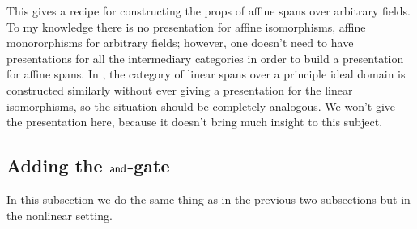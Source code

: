 This gives a recipe for constructing the props of affine spans over arbitrary fields.  To my knowledge there is no presentation for affine isomorphisms, affine monororphisms for arbitrary fields; however, one doesn't need to have presentations for all the intermediary categories in order to build a presentation for affine spans.  In \cite[\S 3.3]{ih}, the category of linear spans over a principle ideal domain is constructed similarly without ever giving a presentation for the linear isomorphisms, so the situation should be completely analogous.  We won't give the presentation here, because it doesn't bring much insight to this subject.  


\subsection{Adding the  \texorpdfstring{${\sf and}$}{and}-gate}
\label{sec:three}
In this subsection we do the same thing as in the previous two subsections but  in the nonlinear setting.
